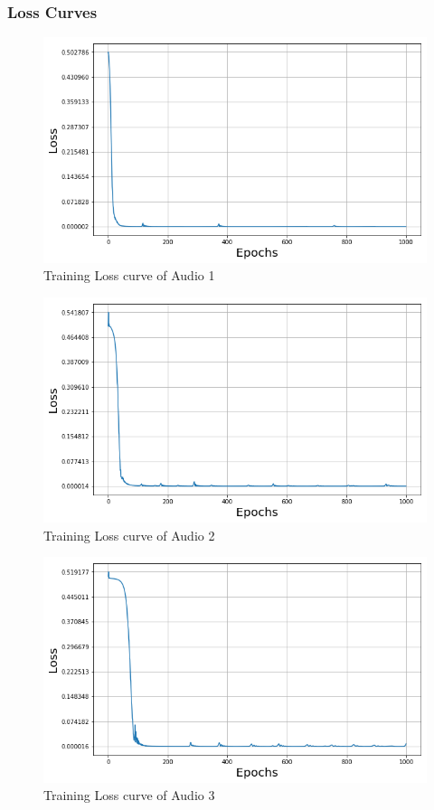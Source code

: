 \documentclass{ioereport}
\begin{document}
    \subsubsection{Loss Curves}
    \begin{figure}[H]
        \centering
        \includegraphics[width=\linewidth]{assets/audio_loss_curves/puretone100.png}
        \caption{Training Loss curve of Audio 1}
        \label{fig:audio-loss-curve-1}
    \end{figure}
    \begin{figure}[H]
        \centering
        \includegraphics[width=\linewidth]{assets/audio_loss_curves/puretone500.png}
        \caption{Training Loss curve of Audio 2}
        \label{fig:audio-loss-curve-2}
    \end{figure}
    \begin{figure}[H]
        \centering
        \includegraphics[width=\linewidth]{assets/audio_loss_curves/puretone1000.png}
        \caption{Training Loss curve of Audio 3}
        \label{fig:audio-loss-curve-3}
    \end{figure}
\end{document}
